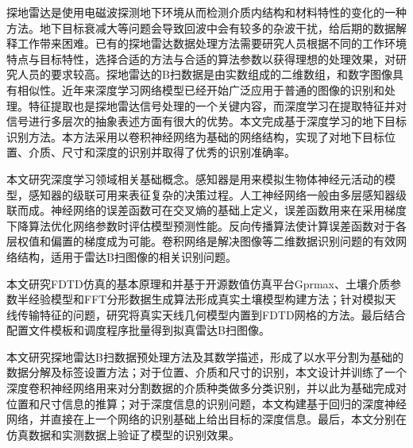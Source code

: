 \begin{chineseabstract}
探地雷达是使用电磁波探测地下环境从而检测介质内结构和材料特性的变化的一种方法。地下目标衰减大等问题会导致回波中会有较多的杂波干扰，给后期的数据解释工作带来困难。已有的探地雷达数据处理方法需要研究人员根据不同的工作环境特点与目标特性，选择合适的方法与合适的算法参数以获得理想的处理效果，对研究人员的要求较高。探地雷达的B扫数据是由实数组成的二维数组，和数字图像具有相似性。近年来深度学习网络模型已经开始广泛应用于普通的图像的识别和处理。特征提取也是探地雷达信号处理的一个关键内容，而深度学习在提取特征并对信号进行多层次的抽象表述方面有很大的优势。本文完成基于深度学习的地下目标识别方法。本方法采用以卷积神经网络为基础的网络结构，实现了对地下目标位置、介质、尺寸和深度的识别并取得了优秀的识别准确率。

本文研究深度学习领域相关基础概念。感知器是用来模拟生物体神经元活动的模型，感知器的级联可用来表征复杂的决策过程。人工神经网络一般由多层感知器级联而成。神经网络的误差函数可在交叉熵的基础上定义，误差函数用来在采用梯度下降算法优化网络参数时评估模型预测性能。反向传播算法使计算误差函数对于各层权值和偏置的梯度成为可能。卷积网络是解决图像等二维数据识别问题的有效网络结构，适用于雷达B扫图像的相关识别问题。

本文研究FDTD仿真的基本原理和并基于开源数值仿真平台Gprmax、土壤介质参数半经验模型和FFT分形数据生成算法形成真实土壤模型构建方法；针对模拟天线传输特征的问题，研究将真实天线几何模型内置到FDTD网格的方法。最后结合配置文件模板和调度程序批量得到拟真雷达B扫图像。

本文研究探地雷达B扫数据预处理方法及其数学描述，形成了以水平分割为基础的数据分解及标签设置方法；对于位置、介质和尺寸的识别，本文设计并训练了一个深度卷积神经网络用来对分割数据的介质种类做多分类识别，并以此为基础完成对位置和尺寸信息的推算；对于深度信息的识别问题，本文构建基于回归的深度神经网络，并直接在上一个网络的识别基础上给出目标的深度信息。最后，本文分别在仿真数据和实测数据上验证了模型的识别效果。

\end{chineseabstract}

